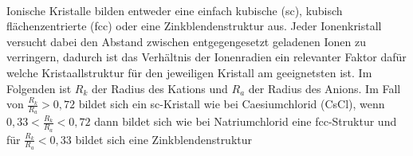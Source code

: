 \documentclass[11pt,a4paper]{article}
\numberwithin{equation}{section}
\numberwithin{figure}{section}
\begin{document}
\\
\begin{addmargin}[25pt]{0pt}     
Ionische Kristalle bilden entweder eine einfach kubische (sc), kubisch flächenzentrierte (fcc) oder eine Zinkblendenstruktur aus. Jeder Ionenkristall versucht dabei den Abstand zwischen entgegengesetzt geladenen Ionen zu verringern, dadurch ist das Verhältnis der Ionenradien ein relevanter Faktor dafür welche Kristaallstruktur für den jeweiligen Kristall am geeignetsten ist. Im Folgenden ist $R_k$ der Radius des Kations und $R_a$ der Radius des Anions. Im Fall von $\frac{R_k}{R_a} > 0,72$ bildet sich ein sc-Kristall wie bei Caesiumchlorid (CsCl), wenn $0,33 < \frac{R_k}{R_a} < 0,72$  dann bildet sich wie bei Natriumchlorid eine fcc-Struktur und für $\frac{R_k}{R_a} < 0,33$ bildet sich eine Zinkblendenstruktur \\
\end{addmargin}
\end{document}
